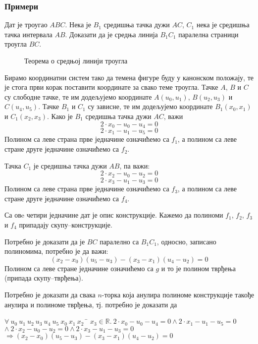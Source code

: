\subsubsection{Примери}

\begin{primer}
\label{primer1}
Дат је троугао $ABC$. Нека је $B_1$ средишња тачка дужи $AC$, $C_1$
нека је средишња тачка интервала $AB$. Доказати да је средња линија
$B_1C_1$ паралелна страници троугла $BC$.

\begin{figure}[hb]
\begin{center}

\end{center}
\caption{Теорема о средњој линији троугла} \label{fig:srednja_linija}
\end{figure}


Бирамо координатни систем тако да темена фигуре буду у канонском
положају, те је стога први корак поставити координате за свако теме
троугла. Тачке $A$, $B$ и $C$ су слободне тачке, те им додељујемо
координате $A(u_0, u_1)$, $B(u_2, u_3)$ и $C(u_4, u_5)$. Тачке $B_1$ и
$C_1$ су зависне, те им додељујемо координате $B_1(x_0, x_1)$ и
$C_1(x_2, x_3)$. Како је $B_1$ средишња тачка дужи $AC$, важи
$$2\cdot x_0 - u_0 - u_4 = 0$$ 
$$2\cdot x_1 - u_1 - u_5 = 0$$ Полином са леве страна прве једначине
означићемо са $f_1$, а полином са леве стране друге једначине
означићемо са $f_2$.

Тачка $C_1$ је средишња тачка дужи $AB$, па важи:
$$2\cdot x_2 - u_0 - u_2 = 0$$
$$2\cdot x_3 - u_1 - u_3 = 0$$ Полином са леве страна прве једначине
означићемо са $f_3$, а полином са леве стране друге једначине
означићемо са $f_4$.

Са овe четири једначине дат је опис конструкције. Кажемо да полиноми
$f_1$, $f_2$, $f_3$ и $f_4$ припадају скупу--конструкције.

Потребно је доказати да је $BC$ паралелно са $B_1C_1$, односно,
записано полиномима, потребно је да важи:
$$(x_2 - x_0)(u_5 - u_3) - (x_3 - x_1)(u_4 - u_2) = 0$$ Полином са
леве стране једначине означићемо са $g$ и то је полином тврђења
(припада скупу--тврђења).

Потребно је доказати да свака $n$-торка која анулира полиноме
конструкције такође анулира и полиноме тврђења, тј. потребно је
доказати да
\begin{tabbing}
$\forall\ u_0\ u_1\ u_2\ u_3\ u_4\ u_5\ x_0\ x_1\ x_2\ $ \= $x_3 \in \mathbb{R}.\ 2\cdot x_0 - u_0 - u_4 = 0 \land 2\cdot x_1 - u_1 - u_5 = 0$ \\
                                                       \> $\land\ 2\cdot x_2 - u_0 - u_2 = 0 \land 2\cdot x_3 - u_1 - u_3 = 0$ \\
                                                        \>$\Longrightarrow (x_2 - x_0)(u_5 - u_3) - (x_3 - x_1)(u_4 - u_2) = 0$
\end{tabbing}
\end{primer}

